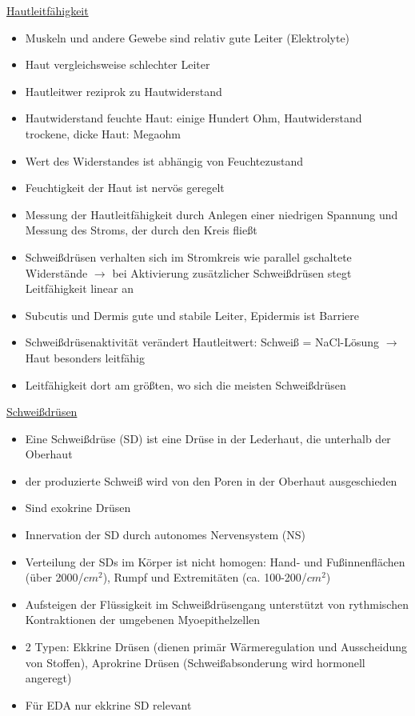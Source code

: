 \documentclass[a4paper,10pt,oneside]{article}
\begin{document}
\underline{Hautleitfähigkeit} \\
	\begin{itemize}
		\item Muskeln und andere Gewebe sind relativ gute Leiter (Elektrolyte)
		\item Haut vergleichsweise schlechter Leiter
		\item Hautleitwer reziprok zu Hautwiderstand
		\item Hautwiderstand feuchte Haut: einige Hundert Ohm, Hautwiderstand trockene, dicke Haut: Megaohm
		\item Wert des Widerstandes ist abhängig von Feuchtezustand
		\item Feuchtigkeit der Haut ist nervös geregelt
		\item Messung der Hautleitfähigkeit durch Anlegen einer niedrigen Spannung und Messung des Stroms, der durch den Kreis fließt
		\item Schweißdrüsen verhalten sich im Stromkreis wie parallel gschaltete Widerstände $\rightarrow$ bei Aktivierung zusätzlicher Schweißdrüsen stegt Leitfähigkeit linear an
		\item Subcutis und Dermis gute und stabile Leiter, Epidermis ist Barriere
		\item Schweißdrüsenaktivität verändert Hautleitwert: Schweiß = NaCl-Lösung $\rightarrow$ Haut besonders leitfähig
		\item Leitfähigkeit dort am größten, wo sich die meisten Schweißdrüsen
	\end{itemize}
	
 		
\underline{Schweißdrüsen} \\
	\begin{itemize}
		\item Eine Schweißdrüse (SD) ist eine Drüse in der Lederhaut, die unterhalb der Oberhaut
		\item der produzierte Schweiß wird von den Poren in der Oberhaut ausgeschieden 
		\item Sind exokrine Drüsen
		\item Innervation der SD durch autonomes Nervensystem (NS)
		\item Verteilung der SDs im Körper ist nicht homogen: Hand- und Fußinnenflächen (über 2000/$cm^2$), Rumpf und Extremitäten (ca. 100-200/$cm^2$)
		\item Aufsteigen der Flüssigkeit im Schweißdrüsengang unterstützt von rythmischen Kontraktionen der umgebenen Myoepithelzellen
		\item 2 Typen: Ekkrine Drüsen (dienen primär Wärmeregulation und Ausscheidung von Stoffen), Aprokrine Drüsen (Schweißabsonderung wird hormonell angeregt)
		\item Für EDA nur ekkrine SD relevant
	\end{itemize}
	
\end{document}
